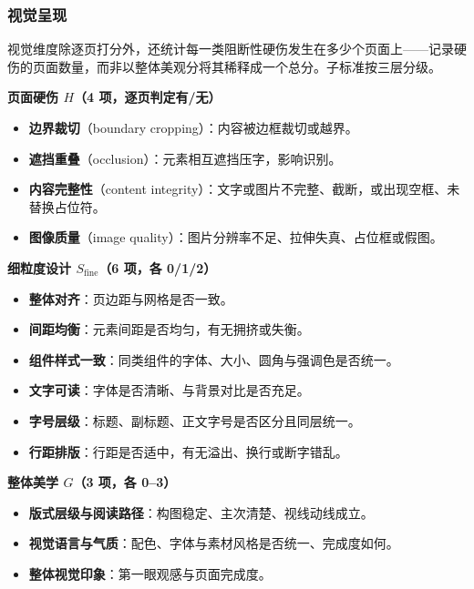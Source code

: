 \subsubsection{视觉呈现}\label{ux89c6ux89c9ux5448ux73b0}

视觉维度除逐页打分外，还统计每一类阻断性硬伤发生在多少个页面上------记录硬伤的页面数量，而非以整体美观分将其稀释成一个总分。子标准按三层分级。

\textbf{页面硬伤 \(H\)（4 项，逐页判定有/无）}

\begin{itemize}
\tightlist
\item
  \textbf{边界裁切}（boundary cropping）：内容被边框裁切或越界。
\item
  \textbf{遮挡重叠}（occlusion）：元素相互遮挡压字，影响识别。
\item
  \textbf{内容完整性}（content integrity）：文字或图片不完整、截断，或出现空框、未替换占位符。
\item
  \textbf{图像质量}（image quality）：图片分辨率不足、拉伸失真、占位框或假图。
\end{itemize}

\textbf{细粒度设计 \(S_{\text{fine}}\)（6 项，各 0/1/2）}

\begin{itemize}
\tightlist
\item
  \textbf{整体对齐}：页边距与网格是否一致。
\item
  \textbf{间距均衡}：元素间距是否均匀，有无拥挤或失衡。
\item
  \textbf{组件样式一致}：同类组件的字体、大小、圆角与强调色是否统一。
\item
  \textbf{文字可读}：字体是否清晰、与背景对比是否充足。
\item
  \textbf{字号层级}：标题、副标题、正文字号是否区分且同层统一。
\item
  \textbf{行距排版}：行距是否适中，有无溢出、换行或断字错乱。
\end{itemize}

\textbf{整体美学 \(G\)（3 项，各 0--3）}

\begin{itemize}
\tightlist
\item
  \textbf{版式层级与阅读路径}：构图稳定、主次清楚、视线动线成立。
\item
  \textbf{视觉语言与气质}：配色、字体与素材风格是否统一、完成度如何。
\item
  \textbf{整体视觉印象}：第一眼观感与页面完成度。
\end{itemize}

